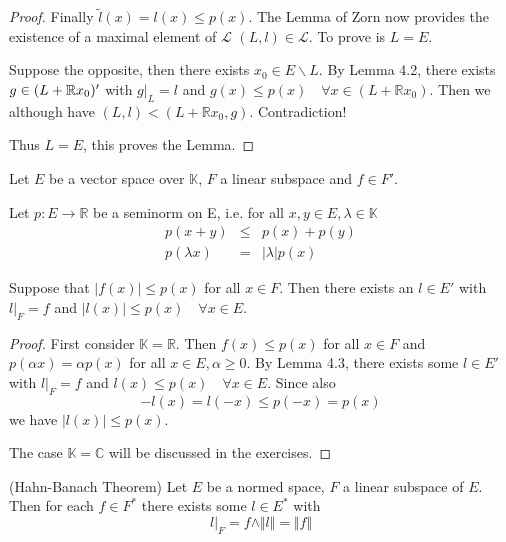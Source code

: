 \begin{proof}
Finally $\tilde{l}(x) =l(x) \leq p(x)$. The Lemma of Zorn now provides the existence of a maximal element of $\mathcal{L}$ $(L,l) \in \mathcal{L}$. To prove is $L=E$. 

Suppose the opposite, then there exists $x_0 \in E \backslash L$. By Lemma 4.2, there exists $g \in (L + \mathbb{R} x_0)'$ with $g \vert_L =l$ and $g(x)\leq p(x) \quad \forall x \in (L+\mathbb{R}x_0)$. Then we although have $(L,l) < (L + \mathbb{R}x_0, g)$. Contradiction!

Thus $L=E$, this proves the Lemma.
\end{proof}

\begin{theo} Let $E$ be a vector space over $\mathbb{K}$, $F$ a linear subspace and $f \in F'$.

Let $p: E \to \mathbb{R}$ be a seminorm on E, i.e. for all $x,y \in E, \lambda \in \mathbb{K}$
\begin{eqnarray*}
p(x+y) &\leq & p(x) + p(y) \\
p(\lambda x) &=& \vert \lambda \vert p(x)
\end{eqnarray*}

Suppose that $\vert f(x) \vert \leq p(x)$ for all $x \in F$. Then there exists an $l \in E'$ with $l\vert_F=f$ and $\vert l(x) \vert \leq p(x) \quad \forall x \in E$.
\end{theo}

\begin{proof}
First consider $\mathbb{K}=\mathbb{R}$. Then $f(x) \leq p(x)$ for all $x \in F$ and $p(\alpha x )= \alpha p(x)$ for all $x\in E , \alpha \geq 0$. By Lemma 4.3, there exists some $l \in E'$ with $l\vert_F=f$ and $l(x)\leq p(x) \quad \forall x \in E$. Since also
\begin{equation*}
-l(x) = l(-x) \leq p(-x)=p(x)
\end{equation*}
we have $\vert l(x) \vert \leq p(x)$.

The case $\mathbb{K}=\mathbb{C}$ will be discussed in the exercises.
\end{proof}

\begin{theo}{(Hahn-Banach Theorem)} Let $E$ be a normed space, $F$ a linear subspace of $E$. Then for each $f \in F^{\ast}$ there exists some $l \in E^{\ast}$ with
\begin{equation*}
l \vert_F =f \land \Vert l \Vert = \Vert f \Vert
\end{equation*}
\end{theo}

